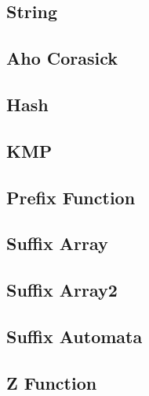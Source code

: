 \documentclass[a4paper,12pt]{article}
\newcommand\addS[4]{
  \subsection{#2}
  
}
\begin{document}
\begin{multicols}{2}
\section{String}
\addS{c++}{Aho Corasick}{string}{corasick.cpp}
\addS{c++}{Hash}{string}{hash.cpp}
\addS{c++}{KMP}{string}{kmp.cpp}
\addS{c++}{Prefix Function}{string}{prefix_function.cpp}
\addS{c++}{Suffix Array}{string}{suffix_array.cpp}
\addS{c++}{Suffix Array2}{string}{suffix_array2.cpp}
\addS{c++}{Suffix Automata}{string}{suffix_automaton.cpp}
\addS{c++}{Z Function}{string}{z_function.cpp}


\end{multicols}
\end{document}
